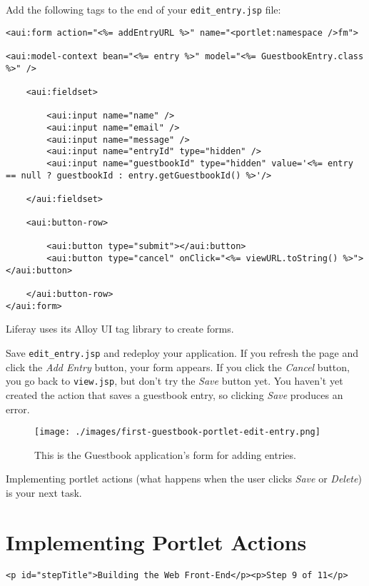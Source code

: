 Add the following tags to the end of your \texttt{edit\_entry.jsp} file:

\begin{verbatim}
<aui:form action="<%= addEntryURL %>" name="<portlet:namespace />fm">

<aui:model-context bean="<%= entry %>" model="<%= GuestbookEntry.class %>" />

    <aui:fieldset>

        <aui:input name="name" />
        <aui:input name="email" />
        <aui:input name="message" />
        <aui:input name="entryId" type="hidden" />
        <aui:input name="guestbookId" type="hidden" value='<%= entry == null ? guestbookId : entry.getGuestbookId() %>'/>

    </aui:fieldset>

    <aui:button-row>

        <aui:button type="submit"></aui:button>
        <aui:button type="cancel" onClick="<%= viewURL.toString() %>"></aui:button>

    </aui:button-row>
</aui:form>
\end{verbatim}

Liferay uses its Alloy UI tag library to create forms.

Save \texttt{edit\_entry.jsp} and redeploy your application. If you
refresh the page and click the \emph{Add Entry} button, your form
appears. If you click the \emph{Cancel} button, you go back to
\texttt{view.jsp}, but don't try the \emph{Save} button yet. You haven't
yet created the action that saves a guestbook entry, so clicking
\emph{Save} produces an error.

\begin{figure}
\centering
\texttt{[image: ./images/first-guestbook-portlet-edit-entry.png]}
\caption{This is the Guestbook application's form for adding entries.}
\end{figure}

Implementing portlet actions (what happens when the user clicks
\emph{Save} or \emph{Delete}) is your next task.

\chapter{Implementing Portlet
Actions}\label{implementing-portlet-actions}

\begin{verbatim}
<p id="stepTitle">Building the Web Front-End</p><p>Step 9 of 11</p>
\end{verbatim}

